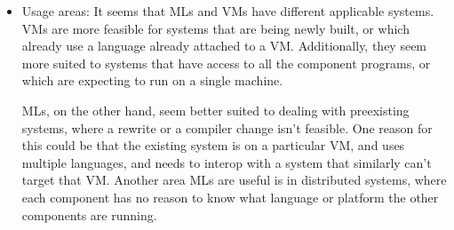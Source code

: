 \documentclass{sig-alternate}
\begin{document}
\begin{itemize}
\item Usage areas: It seems that MLs and VMs have different applicable systems. VMs are more feasible for systems that are being newly built, or which already use a language already attached to a VM. Additionally, they seem more suited to systems that have access to all the component programs, or which are expecting to run on a single machine.

MLs, on the other hand, seem better suited to dealing with preexisting systems, where a rewrite or a compiler change isn't feasible. One reason for this could be that the existing system is on a particular VM, and uses multiple languages, and needs to interop with a system that similarly can't target that VM. Another area MLs are useful is in distributed systems, where each component has no reason to know what language or platform the other components are running.

\end{itemize}





  
\end{document}
